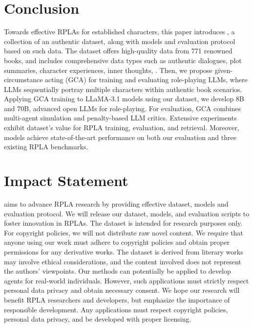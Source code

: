 \section{Conclusion}
Towards effective RPLAs for established characters, 
this paper introduces \method, 
a collection of an authentic dataset, along with models and evaluation protocol based on such data.
The \method dataset offers high-quality data from 771 renowned books, and includes comprehensive data types such as authentic dialogues, plot summaries, character experiences, inner thoughts, \etc.
Then, we propose given-circumstance acting (GCA) for training and evaluating role-playing LLMs, where LLMs sequentially portray multiple characters within authentic book scenarios. 
Applying GCA training to LLaMA-3.1 models using our dataset, we develop \method 8B and \method 70B, advanced open LLMs for role-playing. 
For evaluation, 
GCA combines multi-agent simulation and penalty-based LLM critics. 
Extensive experiments exhibit \method dataset's value for RPLA training, evaluation, and retrieval.
Moreover, \method models achieve state-of-the-art performance on both our evaluation and three existing RPLA benchmarks. 




\section*{Impact Statement} %

\method aims to advance RPLA research by providing effective dataset, models and evaluation protocol. 
We will release our dataset, models, and evaluation scripts to foster innovation in RPLAs. 
The dataset is intended for research purposes only.
For copyright policies, we will not distribute raw novel content. 
We require that anyone using our work must adhere to copyright policies and obtain proper permissions for any derivative works. 
The \method dataset is derived from literary works may involve ethical considerations, and the content involved does not represent the authors' viewpoints. 
Our methods can potentially be applied to develop agents for real-world individuals. 
However, such applications must strictly respect personal data privacy and obtain necessary consent.
We hope our research will benefit RPLA researchers and developers, but emphasize the importance of responsible development. Any applications must respect copyright policies, personal data privacy, and be developed with proper licensing.

